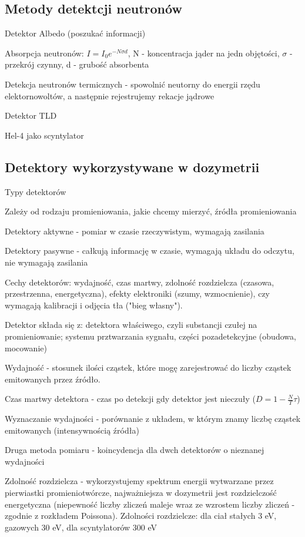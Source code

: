 \documentclass{article}
\begin{document}
\subsection{Metody detektcji neutronów}

Detektor Albedo (poszukać informacji)

Absorpcja neutronów: $I = I_0 e^{-N\sigma d}$, N - koncentracja jąder na jedn objętości, $\sigma$ - przekrój czynny, d - grubość absorbenta

Detekcja neutronów termicznych - spowolnić neutorny do energii rzędu elektornowoltów, a następnie rejestrujemy rekacje jądrowe

Detektor TLD

Hel-4 jako scyntylator

\subsection{Detektory wykorzystywane w dozymetrii}

Typy detektorów

Zależy od rodzaju promieniowania, jakie chcemy mierzyć, źródła promieniowania

Detektory aktywne - pomiar w czasie rzeczywistym, wymagają zasilania

Detektory pasywne - całkują informację w czasie, wymagają układu do odczytu, nie wymagają zasilania

Cechy detektorów: wydajność, czas martwy, zdolność rozdzielcza (czasowa, przestrzenna, energetyczna), efekty elektroniki (szumy, wzmocnienie), czy wymagają kalibracji i odjęcia tła ("bieg własny").

Detektor składa się z: detektora właściwego, czyli substancji czułej na promieniowanie; systemu prztwarzania sygnału, części pozadetekcyjne (obudowa, mocowanie)

Wydajność - stosunek ilości cząstek, które mogę zarejestrować do liczby cząstek emitowanych przez źródło.

Czas martwy detektora - czas po detekcji gdy detektor jest nieczuły ($D = 1 - \frac{N}{T}\tau$)

Wyznaczanie wydajności - porównanie z układem, w którym znamy liczbę cząstek emitowanych (intensywnością źródła)

Druga metoda pomiaru - koincydencja dla dwch detektorów o nieznanej wydajności

Zdolność rozdzielcza - wykorzystujemy spektrum energii wytwarzane przez pierwiastki promieniotwórcze, najważniejsza w dozymetrii jest rozdzielczość energetyczna (niepewność liczby zliczeń maleje wraz ze wzrostem liczby zliczeń - zgodnie z rozkładem Poissona). Zdolności rozdzielcze: dla ciał stałych 3 eV, gazowych 30 eV, dla scyntylatorów 300 eV
\end{document}
